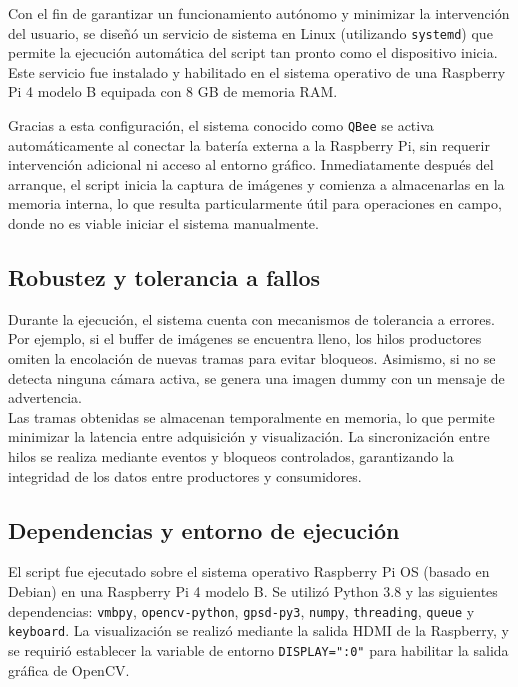     Con el fin de garantizar un funcionamiento autónomo y minimizar la intervención del usuario, se diseñó un servicio de sistema en Linux (utilizando \texttt{systemd}) que permite la ejecución automática del script tan pronto como el dispositivo inicia. Este servicio fue instalado y habilitado en el sistema operativo de una Raspberry Pi 4 modelo B equipada con 8 GB de memoria RAM.
    
    Gracias a esta configuración, el sistema conocido como \texttt{QBee} se activa automáticamente al conectar la batería externa a la Raspberry Pi, sin requerir intervención adicional ni acceso al entorno gráfico. Inmediatamente después del arranque, el script inicia la captura de imágenes y comienza a almacenarlas en la memoria interna, lo que resulta particularmente útil para operaciones en campo, donde no es viable iniciar el sistema manualmente.
    
    \subsection{Robustez y tolerancia a fallos}
    
    Durante la ejecución, el sistema cuenta con mecanismos de tolerancia a errores. Por ejemplo, si el buffer de imágenes se encuentra lleno, los hilos productores omiten la encolación de nuevas tramas para evitar bloqueos. Asimismo, si no se detecta ninguna cámara activa, se genera una imagen dummy con un mensaje de advertencia.\\
    
    Las tramas obtenidas se almacenan temporalmente en memoria, lo que permite minimizar la latencia entre adquisición y visualización. La sincronización entre hilos se realiza mediante eventos y bloqueos controlados, garantizando la integridad de los datos entre productores y consumidores.
    
    \subsection{Dependencias y entorno de ejecución}
    
    El script fue ejecutado sobre el sistema operativo Raspberry Pi OS (basado en Debian) en una Raspberry Pi 4 modelo B. Se utilizó Python 3.8 y las siguientes dependencias: \texttt{vmbpy}, \texttt{opencv-python}, \texttt{gpsd-py3}, \texttt{numpy}, \texttt{threading}, \texttt{queue} y \texttt{keyboard}. La visualización se realizó mediante la salida HDMI de la Raspberry, y se requirió establecer la variable de entorno \texttt{DISPLAY=":0"} para habilitar la salida gráfica de OpenCV.

